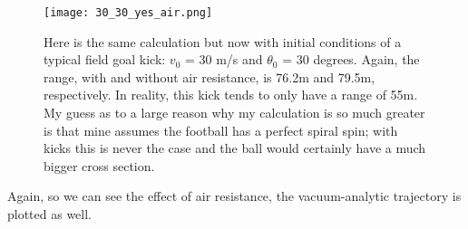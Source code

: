 \documentclass{article}
\begin{document}
\begin{figure}[h!]
   \centering
    \texttt{[image: 30\_30\_yes\_air.png]}
     \caption{Here is the same calculation but now with initial conditions of a typical field goal kick: $v_0$ = 30 m/s and $\theta_0$ = 30 degrees. Again, the range, with and without air resistance, is 76.2m and 79.5m, respectively. In reality, this kick tends to only have a range of 55m. My guess as to a large reason why my calculation is so much greater is that mine assumes the football has a perfect spiral spin; with kicks this is never the case and the ball would certainly have a much bigger cross section.}
\end{figure}

 Again, so we can see the effect of air resistance, the vacuum-analytic trajectory is plotted as well.



\end{document}
